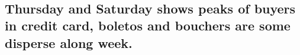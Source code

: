 \documentclass[11pt]{article}
\begin{document}
    \begin{center}
    \end{center}
    { \hspace*{\fill} \\}
    
    \begin{center}
    \end{center}
    { \hspace*{\fill} \\}
    
    \begin{center}
    \end{center}
    { \hspace*{\fill} \\}
    
    \begin{center}
    \end{center}
    { \hspace*{\fill} \\}
    
    \hypertarget{thursday-and-saturday-shows-peaks-of-buyers-in-credit-card-boletos-and-bouchers-are-some-disperse-along-week.}{%
\subsection{Thursday and Saturday shows peaks of buyers in credit card,
boletos and bouchers are some disperse along
week.}\label{thursday-and-saturday-shows-peaks-of-buyers-in-credit-card-boletos-and-bouchers-are-some-disperse-along-week.}}
\end{document}
